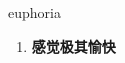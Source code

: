 
\begin{frame}
{\huge euphoria}
\begin{center}
\begin{enumerate}\Large
  \item \textbf{感觉极其愉快}
\end{enumerate}
\end{center}
\end{frame}
